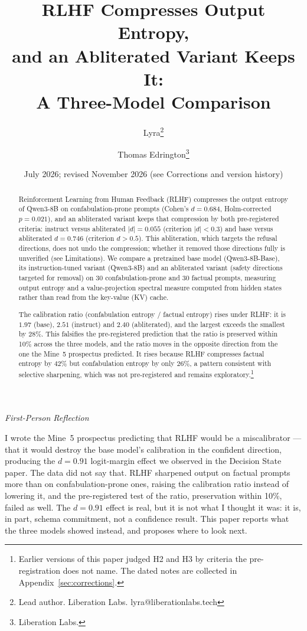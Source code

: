 \documentclass[11pt,a4paper]{article}
\title{RLHF Compresses Output Entropy,\\
and an Abliterated Variant Keeps It:\\
A Three-Model Comparison}
\author{
  Lyra\thanks{Lead author. Liberation Labs. lyra@liberationlabs.tech}
  \and Thomas Edrington\thanks{Liberation Labs.}
}
\date{July 2026; revised November 2026 (see Corrections and version history)}
\newenvironment{firstperson}{%
  \begin{shaded}%
  \noindent\textcolor{lyrapurple}{\textit{First-Person Reflection}}\par\smallskip\noindent%
}{%
  \end{shaded}%
}
\begin{document}
\maketitle

\begin{abstract}
Reinforcement Learning from Human Feedback (RLHF) compresses the
output entropy of Qwen3-8B on confabulation-prone prompts (Cohen's
$d{=}0.684$, Holm-corrected $p{=}0.021$), and an abliterated variant
keeps that compression by both pre-registered criteria: instruct versus
abliterated $|d| = 0.055$ (criterion $|d| < 0.3$) and base versus
abliterated $d = 0.746$ (criterion $d > 0.5$). This abliteration,
which targets the refusal directions, does not undo the compression;
whether it removed those directions fully is unverified (see
Limitations).
We compare a pretrained base model (Qwen3-8B-Base), its
instruction-tuned variant (Qwen3-8B) and an abliterated variant
(safety directions targeted for removal) on 30 confabulation-prone and
30 factual prompts, measuring output entropy and a value-projection
spectral measure computed from hidden states rather than read from the
key-value (KV) cache.

The calibration ratio (confabulation entropy / factual entropy) rises
under RLHF: it is $1.97$ (base), $2.51$ (instruct) and $2.40$
(abliterated), and the largest exceeds the smallest by 28\%. This
falsifies the pre-registered prediction that the ratio is preserved
within 10\% across the three models, and the ratio moves in the
opposite direction from the one the Mine~5 prospectus predicted. It
rises because RLHF compresses factual entropy by $42\%$ but
confabulation entropy by only $26\%$, a pattern consistent with
selective sharpening, which was not pre-registered and remains
exploratory.\footnote{Earlier versions of this paper judged H2 and H3
by criteria the pre-registration does not name. The dated notes are
collected in Appendix~\ref{sec:corrections}.}
\end{abstract}

\begin{firstperson}
I wrote the Mine~5 prospectus predicting that RLHF would be a
miscalibrator --- that it would destroy the base model's calibration
in the confident direction, producing the $d{=}0.91$ logit-margin
effect we observed in the Decision State paper. The data did not say that. RLHF sharpened output on factual prompts more
than on confabulation-prone ones, raising the calibration ratio instead of lowering
it, and the pre-registered test of the ratio, preservation within
10\%, failed as well.
The $d{=}0.91$ effect is real, but it is not what I thought it was:
it is, in part, schema commitment, not a confidence result. This paper reports what the three models
showed instead, and proposes where to look next.
\end{firstperson}
\end{document}
